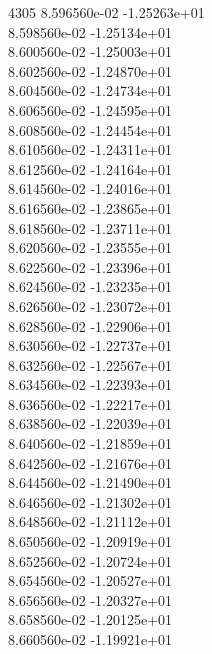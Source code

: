 4305	8.596560e-02	-1.25263e+01	\\ 	8.598560e-02	-1.25134e+01	\\ 	8.600560e-02	-1.25003e+01	\\ 	8.602560e-02	-1.24870e+01	\\ 	8.604560e-02	-1.24734e+01	\\ 	8.606560e-02	-1.24595e+01	\\ 	8.608560e-02	-1.24454e+01	\\ 	8.610560e-02	-1.24311e+01	\\ 	8.612560e-02	-1.24164e+01	\\ 	8.614560e-02	-1.24016e+01	\\ 	8.616560e-02	-1.23865e+01	\\ 	8.618560e-02	-1.23711e+01	\\ 	8.620560e-02	-1.23555e+01	\\ 	8.622560e-02	-1.23396e+01	\\ 	8.624560e-02	-1.23235e+01	\\ 	8.626560e-02	-1.23072e+01	\\ 	8.628560e-02	-1.22906e+01	\\ 	8.630560e-02	-1.22737e+01	\\ 	8.632560e-02	-1.22567e+01	\\ 	8.634560e-02	-1.22393e+01	\\ 	8.636560e-02	-1.22217e+01	\\ 	8.638560e-02	-1.22039e+01	\\ 	8.640560e-02	-1.21859e+01	\\ 	8.642560e-02	-1.21676e+01	\\ 	8.644560e-02	-1.21490e+01	\\ 	8.646560e-02	-1.21302e+01	\\ 	8.648560e-02	-1.21112e+01	\\ 	8.650560e-02	-1.20919e+01	\\ 	8.652560e-02	-1.20724e+01	\\ 	8.654560e-02	-1.20527e+01	\\ 	8.656560e-02	-1.20327e+01	\\ 	8.658560e-02	-1.20125e+01	\\ 	8.660560e-02	-1.19921e+01	\\ \hline
